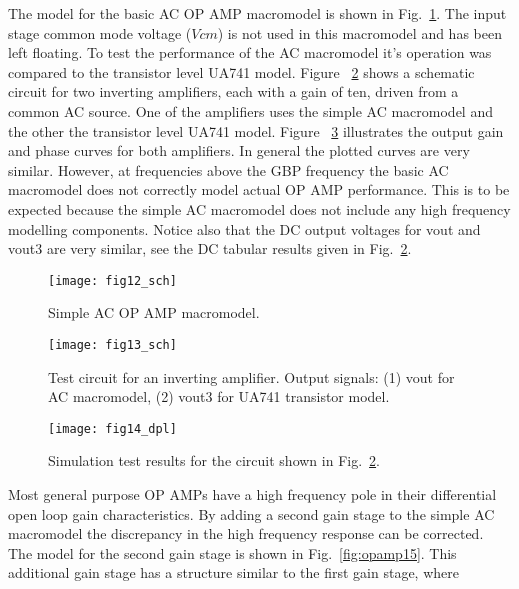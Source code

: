 The model for the basic AC OP AMP macromodel is shown in Fig.~\ref{fig:opamp12}. The input stage common mode voltage ($Vcm$) is not used in this macromodel and has been left floating.  To test the performance of the AC macromodel it's operation was compared to the transistor level UA741 model. Figure ~\ref{fig:opamp13} shows a schematic circuit for two inverting amplifiers, each with a gain of ten, driven from a common AC source. One of the amplifiers uses the simple AC macromodel and the other the transistor level UA741 model.  Figure ~\ref{fig:opamp14} illustrates the output gain and phase curves for both amplifiers. In general the plotted curves are very similar.  However, at frequencies above the GBP frequency the basic AC macromodel does not correctly model actual OP AMP performance. This is to be expected because the simple AC macromodel does not include any high frequency modelling components.  Notice also that the DC output voltages for vout and vout3 are very similar, see the DC tabular results given in Fig.~\ref{fig:opamp13}. 

\begin{figure}
  \centering
  \texttt{[image: fig12\_sch]} 
  \caption{Simple AC OP AMP macromodel.}
  \label{fig:opamp12}
\end{figure}

\begin{figure}
  \centering
  \texttt{[image: fig13\_sch]}
 \caption{Test circuit for an inverting amplifier. Output signals: (1) vout for AC macromodel, (2) vout3 for UA741 transistor model.}
  \label{fig:opamp13}
\end{figure}

\begin{figure}
  \centering
  \texttt{[image: fig14\_dpl]}
  \caption{Simulation test results for the circuit shown in Fig.~\ref{fig:opamp13}.} 
  \label{fig:opamp14}
\end{figure}


Most general purpose OP AMPs have a high frequency pole in their differential open loop gain characteristics.  By adding a second gain stage to the simple AC macromodel the discrepancy in the high frequency response can be corrected.  The model for the second gain stage is shown in Fig.~\ref{fig:opamp15}.  This additional gain stage has a structure similar to the first gain stage, where

